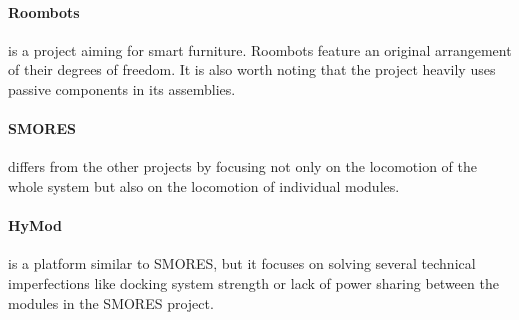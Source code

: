 \paragraph{Roombots} \cite{bonardi_locomotion_2012} is a project aiming for
smart furniture. Roombots feature an original arrangement of their degrees of
freedom. It is also worth noting that the project heavily uses passive
components in its assemblies.

\paragraph{SMORES} \cite{davey_emulating_2012} differs from the other projects
by focusing not only on the locomotion of the whole system but also on the
locomotion of individual modules.

\paragraph{HyMod} \cite{parrott_hymod:_2016} is a platform similar to SMORES, but
it focuses on solving several technical imperfections like docking system
strength or lack of power sharing between the modules in the SMORES project.
